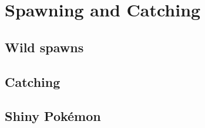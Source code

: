\chapter{Spawning and Catching}
\label{chap:spawn}

\section{Wild spawns}
\label{sec:spawns}

\section{Catching}
\label{sec:catch}

\section{Shiny Pokémon}
\label{sec:shiny}

